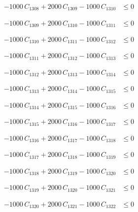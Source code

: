 \documentclass[a4paper,11pt]{article}
\begin{document}
\begin{align}
-1000\,C_{1308} + 2000\,C_{1309} - 1000\,C_{1310} &\leq 0 \nonumber
\end{align}

\begin{align}
-1000\,C_{1309} + 2000\,C_{1310} - 1000\,C_{1311} &\leq 0 \nonumber
\end{align}

\begin{align}
-1000\,C_{1310} + 2000\,C_{1311} - 1000\,C_{1312} &\leq 0 \nonumber
\end{align}

\begin{align}
-1000\,C_{1311} + 2000\,C_{1312} - 1000\,C_{1313} &\leq 0 \nonumber
\end{align}

\begin{align}
-1000\,C_{1312} + 2000\,C_{1313} - 1000\,C_{1314} &\leq 0 \nonumber
\end{align}

\begin{align}
-1000\,C_{1313} + 2000\,C_{1314} - 1000\,C_{1315} &\leq 0 \nonumber
\end{align}

\begin{align}
-1000\,C_{1314} + 2000\,C_{1315} - 1000\,C_{1316} &\leq 0 \nonumber
\end{align}

\begin{align}
-1000\,C_{1315} + 2000\,C_{1316} - 1000\,C_{1317} &\leq 0 \nonumber
\end{align}

\begin{align}
-1000\,C_{1316} + 2000\,C_{1317} - 1000\,C_{1318} &\leq 0 \nonumber
\end{align}

\begin{align}
-1000\,C_{1317} + 2000\,C_{1318} - 1000\,C_{1319} &\leq 0 \nonumber
\end{align}

\begin{align}
-1000\,C_{1318} + 2000\,C_{1319} - 1000\,C_{1320} &\leq 0 \nonumber
\end{align}

\begin{align}
-1000\,C_{1319} + 2000\,C_{1320} - 1000\,C_{1321} &\leq 0 \nonumber
\end{align}

\begin{align}
-1000\,C_{1320} + 2000\,C_{1321} - 1000\,C_{1322} &\leq 0 \nonumber
\end{align}
\end{document}
